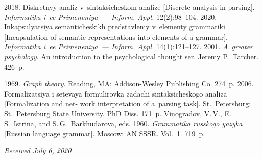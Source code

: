 







  \begin{multicols}{2}

\renewcommand{\bibname}{\protect\rmfamily References}

{\small\frenchspacing
 {%
 \begin{thebibliography}{9}
 2018. 
Diskretnyy analiz v~sintaksicheskom analize
[Discrete analysis in parsing].
\textit{Informatika i~ee Primeneniya~--- Inform. Appl.} 12(2):98--104.
 2020. Inkapsulyatsiya semanticheskikh 
predstavleniy v~elementy grammatiki [Incapsulation of semantic representations into 
elements of a grammar]. \textit{Informatika i~ee Primeneniya~--- Inform. Appl.}  
14(1):121--127.
 2001. 
\textit{A~greater psychology}. An introduction to the psychological thought ser. Jeremy P.~Tarcher. 426~p.


 1969. \textit{Graph theory}. Reading, MA: Addison-Wesley 
Publishing Co. 274~p.
 2006. Formalizatsiya i setevaya formulirovka zadachi sintaksicheskogo 
analiza [Formalization and net- work interpretation of a~parsing task]. St.\ Petersburg: St.\ 
Petersburg State University. PhD Diss. 171~p.
Vinogradov, V.\,V., E.\,S.~Istrina, and S.\,G.~Barkhudarova, eds. 1960. \textit{Grammatika 
russkogo yazyka} [Russian language grammar]. Moscow: AN SSSR. Vol.~1. 719~p.
\end{thebibliography}

 }
 }

\end{multicols}

\vspace*{-6pt}

\hfill{\small\textit{Received July 6, 2020}}

